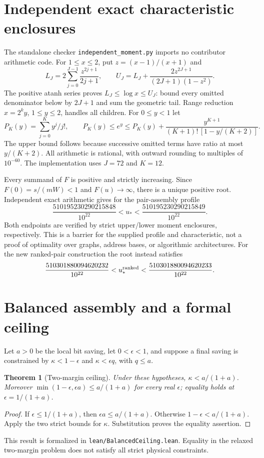 \documentclass[11pt]{article}
\newtheorem{theorem}{Theorem}
\begin{document}
\section{Independent exact characteristic enclosures}
The standalone checker \texttt{independent\_moment.py} imports no contributor
arithmetic code. For $1\le x\le2$, put $z=(x-1)/(x+1)$ and
\[
 L_J=2\sum_{j=0}^{J-1}\frac{z^{2j+1}}{2j+1},\qquad
 U_J=L_J+\frac{2z^{2J+1}}{(2J+1)(1-z^2)}.
\]
The positive atanh series proves $L_J\le\log x\le U_J$: bound every
omitted denominator below by $2J+1$ and sum the geometric tail. Range
reduction $x=2^k y$, $1\le y\le2$, handles all children.
For $0\le y<1$ let
\[
 P_K(y)=\sum_{j=0}^K y^j/j!,\qquad
 P_K(y)\le e^y\le P_K(y)+
 \frac{y^{K+1}}{(K+1)!\,[1-y/(K+2)]}.
\]
The upper bound follows because successive omitted terms have ratio at most
$y/(K+2)$. All arithmetic is rational, with outward rounding to multiples
of $10^{-60}$. The implementation uses $J=72$ and $K=12$.

Every summand of $F$ is positive and strictly increasing. Since
$F(0)=s/(mW)<1$ and $F(u)\to\infty$, there is a unique positive root.
Independent exact arithmetic gives for the pair-assembly profile
\[
 \frac{510195230290215848}{10^{22}}
 < u_* <
 \frac{510195230290215849}{10^{22}}.
\]
Both endpoints are verified by strict upper/lower moment enclosures, respectively.
This is a barrier for the supplied profile and characteristic, not a proof of
optimality over graphs, address bases, or algorithmic architectures.
For the new ranked-pair construction the root instead satisfies
\[
 \frac{510301880094620232}{10^{22}}
 <u_*^{\rm ranked}<
 \frac{510301880094620233}{10^{22}}.
\]

\section{Balanced assembly and a formal ceiling}
Let $a>0$ be the local bit saving, let $0<\epsilon<1$, and suppose a final
saving is constrained by $\kappa<1-\epsilon$ and
$\kappa<\epsilon q$, with $q\le a$.
\begin{theorem}[Two-margin ceiling]
Under these hypotheses, $\kappa<a/(1+a)$.
Moreover
$\min(1-\epsilon,\epsilon a)\le a/(1+a)$ for every real $\epsilon$;
equality holds at $\epsilon=1/(1+a)$.
\end{theorem}
\begin{proof}
If $\epsilon\le1/(1+a)$, then $\epsilon a\le a/(1+a)$.
Otherwise $1-\epsilon<a/(1+a)$. Apply the two strict bounds for $\kappa$.
Substitution proves the equality assertion.
\end{proof}
This result is formalized in \texttt{lean/BalancedCeiling.lean}. Equality in
the relaxed two-margin problem does not satisfy all strict physical constraints.
\end{document}
